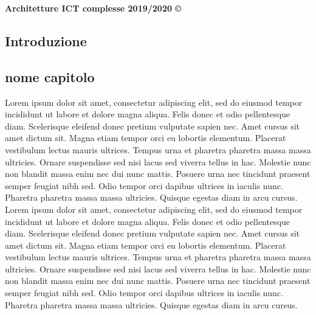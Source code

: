 \documentclass[8pt,a4paper]{article}
\begin{document}
\thispagestyle{empty}
\noindent
  \textbf{Architetture ICT complesse 2019/2020 ©}
\begin{multicols}{4}
   \section{Introduzione}
   \subsection{nome capitolo}
   Lorem ipsum dolor sit amet, consectetur adipiscing elit, sed do eiusmod tempor incididunt ut labore et dolore magna aliqua. Felis donec et odio pellentesque diam. Scelerisque eleifend donec pretium vulputate sapien nec. Amet cursus sit amet dictum sit. Magna etiam tempor orci eu lobortis elementum. Placerat vestibulum lectus mauris ultrices. Tempus urna et pharetra pharetra massa massa ultricies. Ornare suspendisse sed nisi lacus sed viverra tellus in hac. Molestie nunc non blandit massa enim nec dui nunc mattis. Posuere urna nec tincidunt praesent semper feugiat nibh sed. Odio tempor orci dapibus ultrices in iaculis nunc. Pharetra pharetra massa massa ultricies. Quisque egestas diam in arcu cursus.
   Lorem ipsum dolor sit amet, consectetur adipiscing elit, sed do eiusmod tempor incididunt ut labore et dolore magna aliqua. Felis donec et odio pellentesque diam. Scelerisque eleifend donec pretium vulputate sapien nec. Amet cursus sit amet dictum sit. Magna etiam tempor orci eu lobortis elementum. Placerat vestibulum lectus mauris ultrices. Tempus urna et pharetra pharetra massa massa ultricies. Ornare suspendisse sed nisi lacus sed viverra tellus in hac. Molestie nunc non blandit massa enim nec dui nunc mattis. Posuere urna nec tincidunt praesent semper feugiat nibh sed. Odio tempor orci dapibus ultrices in iaculis nunc. Pharetra pharetra massa massa ultricies. Quisque egestas diam in arcu cursus.

	
\end{multicols}
\end{document}
